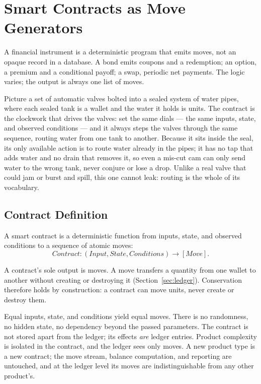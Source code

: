 \section{Smart Contracts as Move Generators}
\label{sec:contracts}

A financial instrument is a deterministic program that emits moves, not an opaque record in a database. A bond emits coupons and a redemption; an option, a premium and a conditional payoff; a swap, periodic net payments. The logic varies; the output is always one list of moves.

\begin{mentalmodel}
Picture a set of automatic valves bolted into a sealed system of water pipes, where each sealed tank is a wallet and the water it holds is units. The contract is the clockwork that drives the valves: set the same dials --- the same inputs, state, and observed conditions --- and it always steps the valves through the same sequence, routing water from one tank to another. Because it sits inside the seal, its only available action is to route water already in the pipes; it has no tap that adds water and no drain that removes it, so even a mis-cut cam can only send water to the wrong tank, never conjure or lose a drop. Unlike a real valve that could jam or burst and spill, this one cannot leak: routing is the whole of its vocabulary.
\end{mentalmodel}

\subsection{Contract Definition}

\begin{definition}
A smart contract is a deterministic function from inputs, state, and observed conditions to a sequence of atomic moves:
\[
\textit{Contract} : (\textit{Input}, \textit{State}, \textit{Conditions}) \to [\textit{Move}].
\]
\end{definition}

\noindent A contract's sole output is moves. A move transfers a quantity from one wallet to another without creating or destroying it (Section~\ref{sec:ledger}). Conservation therefore holds by construction: a contract can move units, never create or destroy them.

\noindent Equal inputs, state, and conditions yield equal moves. There is no randomness, no hidden state, no dependency beyond the passed parameters. The contract is not stored apart from the ledger; its effects \emph{are} ledger entries. Product complexity is isolated in the contract, and the ledger sees only moves. A new product type is a new contract; the move stream, balance computation, and reporting are untouched, and at the ledger level its moves are indistinguishable from any other product's.

